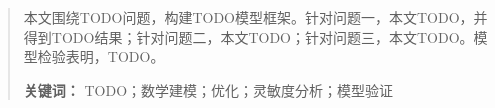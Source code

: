 \begin{abstract}
本文围绕TODO问题，构建TODO模型框架。针对问题一，本文TODO，并得到TODO结果；针对问题二，本文TODO；针对问题三，本文TODO。模型检验表明，TODO。

\textbf{关键词：} TODO；数学建模；优化；灵敏度分析；模型验证
\end{abstract}
